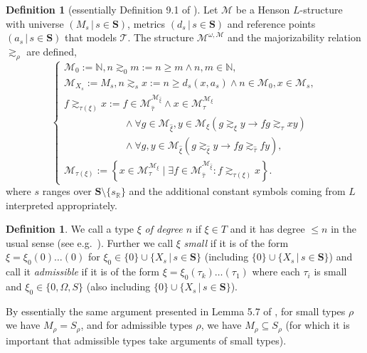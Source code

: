 \documentclass[11pt]{amsart}
\theoremstyle{definition}
\newtheorem{definition}[theorem]{Definition}
\theoremstyle{remark}
\def\RR{\mathbb{R}}
\begin{document}
\begin{definition}[essentially Definition 9.1 of \cite{GeK2008}]
Let $\mathscr{M}$ be a Henson $L$-structure with universe $(M_s\,|\, s \in \mathbf{S})$, metrics $(d_s\,|\, s \in \mathbf{S})$ and reference points $(a_s\,|\, s \in \mathbf{S})$ that models $\mathcal{T}$. The structure $\mathcal{M}^{\omega,\mathscr{M}}$ and the majorizability relation $\gtrsim_\rho$ are defined,
\[
\begin{cases}
\mathcal{M}_0:=\mathbb{N}, n\gtrsim_0 m:=n\geq m\land n,m\in\mathbb{N},\\
\mathcal{M}_{X_s}:= M_s, n\gtrsim_s x:= n\geq d_s(x,a_s)\land n\in \mathcal{M}_0,x\in \mathcal{M}_s,\\
f\gtrsim_{\tau(\xi)}x:=f\in \mathcal{M}_{\widehat{\tau}}^{\mathcal{M}_{\widehat{\xi}}}\land x\in \mathcal{M}_\tau^{\mathcal{M}_\xi}\\
\qquad\qquad\qquad\land\forall g\in \mathcal{M}_{\widehat{\xi}},y\in \mathcal{M}_\xi(g\gtrsim_\xi y\rightarrow fg\gtrsim_\tau xy)\\
\qquad\qquad\qquad\land\forall g,y\in \mathcal{M}_{\widehat{\xi}}(g\gtrsim_{\widehat{\xi}}y\rightarrow fg\gtrsim_{\widehat{\tau}}fy),\\
\mathcal{M}_{\tau(\xi)}:=\left\{x\in \mathcal{M}_\tau^{\mathcal{M}_\xi}\mid \exists f\in \mathcal{M}^{\mathcal{M}_{\widehat{\xi}}}_{\widehat{\tau}}:f\gtrsim_{\tau(\xi)}x\right\}.
\end{cases}
\]
where $s$ ranges over $\mathbf{S}\setminus\{s_\RR\}$ and the additional constant symbols coming from $L$ interpreted appropriately.
\end{definition}
\begin{definition}
    We call a type $\xi$ \emph{of degree $n$} if $\xi\in T$ and it has degree $\leq n$ in the usual sense (see e.g.\ \cite{Kohlenbach2008}). Further we call $\xi$ \emph{small} if it is of the form $\xi=\xi_0(0)\dots(0)$ for $\xi_0\in\{0\}\cup\{X_s\,|\, s \in \mathbf{S}\}$ (including $\{0\}\cup\{X_s\,|\, s \in \mathbf{S}\}$) and call it \emph{admissible} if it is of the form $\xi=\xi_0(\tau_k)\dots(\tau_1)$ where each $\tau_i$ is small and $\xi_0\in\{0,\Omega,S\}$ (also including $\{0\}\cup\{X_s\,|\, s \in \mathbf{S}\}$).
\end{definition}
By essentially the same argument presented in Lemma 5.7 of \cite{GuK2016}, for small types $\rho$ we have $M_\rho=S_\rho$, and for admissible types $\rho$, we have $M_\rho\subseteq S_\rho$ (for which it is important that admissible types take arguments of small types). 
\end{document}
